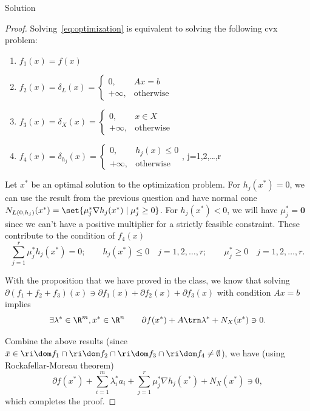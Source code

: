 \documentclass{article}
\theoremstyle{plain}
\theoremstyle{definition}
\theoremstyle{remark}
\begin{document}
\begin{solution}
    {Solution}
    \begin{proof}
        Solving~\cref{eq:optimization} is equivalent to solving the following cvx problem:
        \begin{enumerate}
            \item $f_1(x)=f(x)$
            \item $f_2(x)=\delta_L(x)=\begin{cases}
                0, & Ax = b \\
                +\infty, & \text{otherwise}
            \end{cases}$
            \item $f_3(x)=\delta_X(x)=\begin{cases}
                0, & x\in X \\
                +\infty, & \text{otherwise}
            \end{cases}$
            \item $f_4(x)=\delta_{h_j}(x)=\begin{cases}
                0, & h_j(x)\leq 0\\
                +\infty, & \text{otherwise}
            \end{cases}$, j=1,2,\dots,r 
        \end{enumerate}
        Let $x^*$ be an optimal solution to the optimization problem. For $h_j(x^*)=0$, we can use the result from the previous question and have normal cone $N_{L(0,h_j)}(x^*)=\set{\mu_j^*\nabla h_j(x^*)\mid \mu_j^*\geq 0}$. For $h_j(x^*)<0$, we will have $\mu_j^*=\bm{0}$ since we can't have a positive multiplier for a strictly feasible constraint. These contribute to the condition of $f_4(x)$ \[\sum_{j=1}^{r}\mu^*_j h_j(x^*) = 0; \qquad h_j(x^*) \leq 0 \quad j=1,2,\dots,r; \qquad \mu^*_j \geq 0 \quad j=1,2,\dots,r.\]

        With the proposition that we have proved in the class, we know that solving $\partial(f_1+f_2+f_3)(x)\ni\partial f_1(x)+\partial f_2(x) + \partial f_3(x)$ with condition $Ax=b$ implies \[\exists \lambda^*\in\R^m, x^*\in\R^n \qquad \partial f(x^*) + A\trn\lambda^* + N_X(x^*) \ni 0.\]

        Combine the above results (since $\bar{x}\in\ri\dom f_1\cap\ri\dom f_2\cap\ri\dom f_3\cap\ri\dom f_4\neq\emptyset$), we have (using Rockafellar-Moreau theorem) \[\partial f(x^*)+\sum_{i=1}^{m}\lambda^*_i a_i+\sum_{j=1}^{r}\mu^*_j\nabla h_j(x^*)+N_X(x^*) \ni 0,\] which completes the proof.
    \end{proof}
\end{solution}
\end{document}
